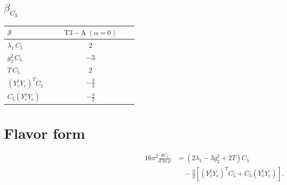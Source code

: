 \documentclass[9pt]{article}
\begin{document}
\subsection*{$ \beta_{C_5} $}
\begin{longtable}{@{}p{0.31\linewidth}c@{}}
\toprule
$\mathcal{S}$ & $ \mathrm{T3-A}\;(\alpha=0) $ \\
\midrule
$ \lambda_1\,C_5 $ & $ 2 $ \\
$ g_2^2\,C_5 $ & $ -3 $ \\
$ T\,C_5 $ & $ 2 $ \\
$ (Y_e^\dagger Y_e)^T C_5 $ & $ - \frac{3}{2} $ \\
$ C_5(Y_e^\dagger Y_e) $ & $ - \frac{3}{2} $ \\
\bottomrule
\end{longtable}
\section*{Flavor form}
\begin{align}
16\pi^2\frac{dC_5}{d\ln\mu}&=(2\lambda_1-3g_2^2+2T)C_5\\
&\quad-\frac32\left[(Y_e^\dagger Y_e)^T C_5+C_5(Y_e^\dagger Y_e)\right].
\end{align}
\end{document}
